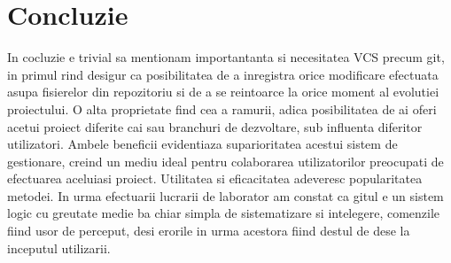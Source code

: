 \section*{Concluzie}


	In cocluzie e trivial sa mentionam importantanta si necesitatea VCS precum git, in primul rind desigur ca posibilitatea de a inregistra orice modificare efectuata asupa fisierelor din repozitoriu si de a se reintoarce la orice moment al evolutiei proiectului. O alta proprietate find cea a ramurii, adica posibilitatea de ai oferi acetui proiect diferite cai sau branchuri de dezvoltare, sub influenta diferitor utilizatori. Ambele beneficii evidentiaza suparioritatea acestui sistem de gestionare, creind un mediu ideal pentru colaborarea utilizatorilor preocupati de efectuarea aceluiasi proiect. Utilitatea si eficacitatea adeveresc popularitatea metodei. In urma efectuarii lucrarii de laborator am constat ca gitul e un sistem logic cu greutate medie ba chiar simpla de sistematizare si intelegere, comenzile fiind usor de perceput, desi erorile in urma acestora fiind destul de dese la inceputul utilizarii.


\clearpage